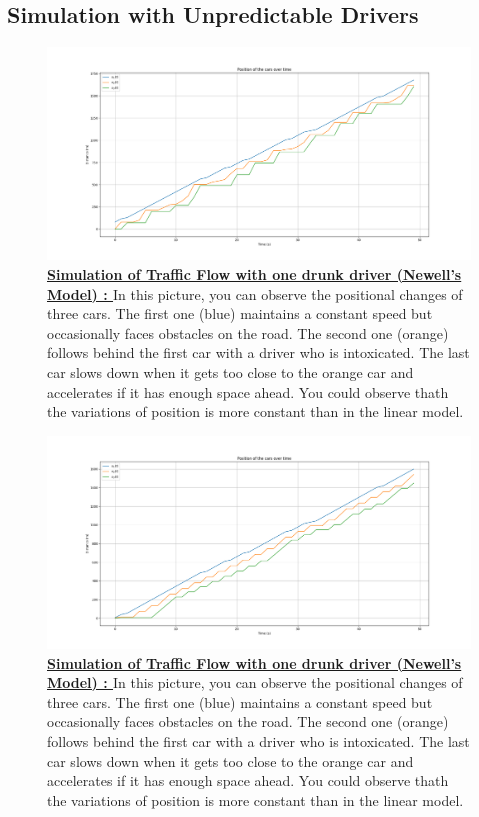 \documentclass{article}
\begin{document}
		\subsection{Simulation with Unpredictable Drivers}
		
			\begin{figure}[H]
			\centering
			\includegraphics[width=\textwidth]{Model1W3C_O_Aco_I2_Linear.png}
			\caption[Simulation of Traffic Flow with one drunk driver (Newell's Model).]{\textbf{\underline{Simulation of Traffic Flow with one drunk driver (Newell's Model) : }} In this picture, you can observe the positional changes of three cars. The first one (blue) maintains a constant speed but occasionally faces obstacles on the road. The second one (orange) follows behind the first car with a driver who is intoxicated. The last car slows down when it gets too close to the orange car and accelerates if it has enough space ahead. You could observe thath the variations of position is more constant than in the linear model.}
			\label{fig:Model1W3C_O_Aco_I2_Linear}
		\end{figure}
		
			\begin{figure}[H]
			\centering
			\includegraphics[width=\textwidth]{Model1W3C_O_Aco_I2_Newell.png}
			\caption[Simulation of Traffic Flow with one drunk driver (Newell's Model).]{\textbf{\underline{Simulation of Traffic Flow with one drunk driver (Newell's Model) : }} In this picture, you can observe the positional changes of three cars. The first one (blue) maintains a constant speed but occasionally faces obstacles on the road. The second one (orange) follows behind the first car with a driver who is intoxicated. The last car slows down when it gets too close to the orange car and accelerates if it has enough space ahead. You could observe thath the variations of position is more constant than in the linear model.}
			\label{fig:Model1W3C_O_Aco_I2_Newell}
		\end{figure}
	
\end{document}
